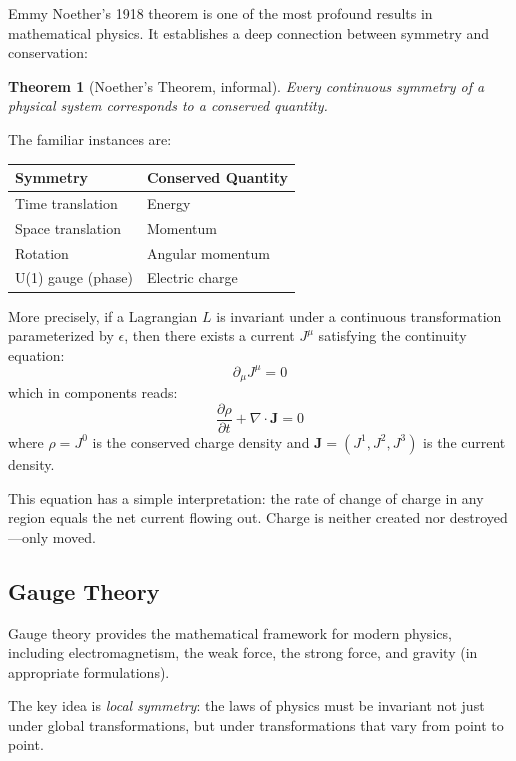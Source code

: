 \documentclass[12pt,letterpaper]{article}
\newtheorem{theorem}{Theorem}[section]
\theoremstyle{definition}
\theoremstyle{remark}
\begin{document}
Emmy Noether's 1918 theorem is one of the most profound results in mathematical physics. It establishes a deep connection between symmetry and conservation:

\begin{theorem}[Noether's Theorem, informal]
Every continuous symmetry of a physical system corresponds to a conserved quantity.
\end{theorem}

The familiar instances are:

\begin{center}
\begin{tabular}{ll}
\toprule
\textbf{Symmetry} & \textbf{Conserved Quantity} \\
\midrule
Time translation & Energy \\
Space translation & Momentum \\
Rotation & Angular momentum \\
U(1) gauge (phase) & Electric charge \\
\bottomrule
\end{tabular}
\end{center}

More precisely, if a Lagrangian $L$ is invariant under a continuous transformation parameterized by $\epsilon$, then there exists a current $J^\mu$ satisfying the continuity equation:
\begin{equation}
\partial_\mu J^\mu = 0
\end{equation}
which in components reads:
\begin{equation}
\frac{\partial \rho}{\partial t} + \nabla \cdot \mathbf{J} = 0
\end{equation}
where $\rho = J^0$ is the conserved charge density and $\mathbf{J} = (J^1, J^2, J^3)$ is the current density.

This equation has a simple interpretation: the rate of change of charge in any region equals the net current flowing out. Charge is neither created nor destroyed---only moved.

\subsection{Gauge Theory}

Gauge theory provides the mathematical framework for modern physics, including electromagnetism, the weak force, the strong force, and gravity (in appropriate formulations).

The key idea is \textit{local symmetry}: the laws of physics must be invariant not just under global transformations, but under transformations that vary from point to point.
\end{document}
